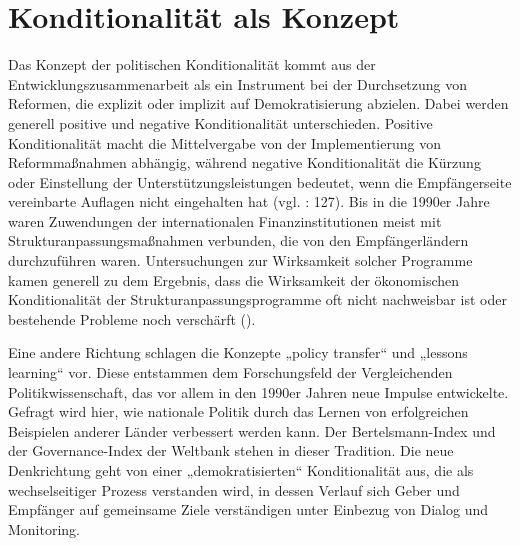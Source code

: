 \section{Konditionalität als Konzept}
Das Konzept der politischen Konditionalität kommt aus der Entwicklungszusammenarbeit als ein Instrument bei der Durchsetzung von Reformen, die explizit oder implizit auf Demokratisierung abzielen. Dabei werden generell positive und negative Konditionalität unterschieden. Positive Konditionalität macht die Mittelvergabe von der Implementierung von Reformmaßnahmen abhängig, während negative Konditionalität die Kürzung oder Einstellung der Unterstützungsleistungen bedeutet, wenn die Empfängerseite vereinbarte Auflagen nicht eingehalten hat (vgl. \cite{schmitz09} : 127). Bis in die 1990er Jahre waren Zuwendungen der internationalen Finanzinstitutionen meist mit Strukturanpassungsmaßnahmen verbunden, die von den Empfängerländern durchzuführen waren. Untersuchungen zur Wirksamkeit solcher Programme kamen generell zu dem Ergebnis, dass die Wirksamkeit der ökonomischen Konditionalität der Strukturanpassungsprogramme oft nicht nachweisbar ist oder bestehende Probleme noch verschärft (\cite{killick, morrissey}). 
\par
Eine andere Richtung schlagen die Konzepte „policy transfer“ und „lessons learning“ vor. Diese entstammen dem Forschungsfeld der Vergleichenden Politikwissenschaft, das vor allem in den 1990er Jahren neue Impulse entwickelte. Gefragt wird hier, wie nationale Politik durch das Lernen von erfolgreichen Beispielen anderer Länder verbessert werden kann. Der Bertelsmann-Index und der Governance-Index der Weltbank stehen in dieser Tradition. Die neue Denkrichtung geht von einer „demokratisierten“ Konditionalität aus, die als wechselseitiger Prozess verstanden wird, in dessen Verlauf sich Geber und Empfänger auf gemeinsame Ziele verständigen unter Einbezug von Dialog und Monitoring.
